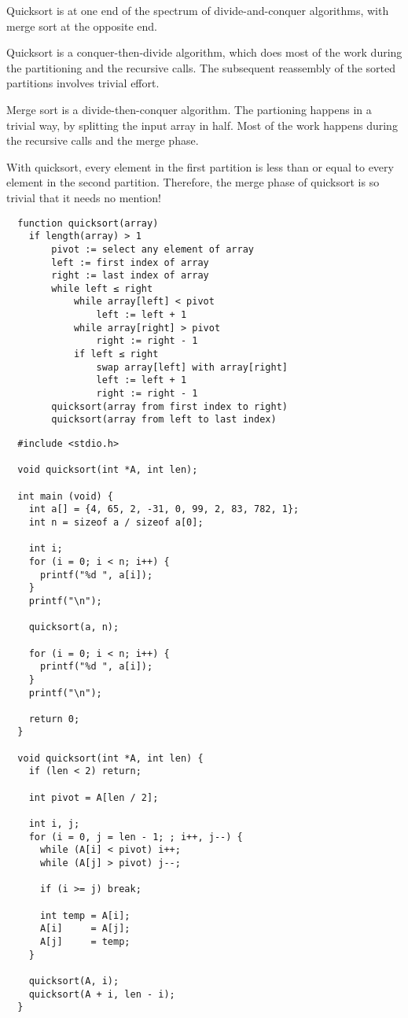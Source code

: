 \documentclass{article}
\begin{document}
Quicksort is at one end of the spectrum of divide-and-conquer algorithms, with merge sort at the opposite end.

Quicksort is a conquer-then-divide algorithm, which does most of the work during the partitioning and the recursive calls. 
The subsequent reassembly of the sorted partitions involves trivial effort.

Merge sort is a divide-then-conquer algorithm. The partioning happens in a trivial way, by splitting the input array in half. 
Most of the work happens during the recursive calls and the merge phase.

With quicksort, every element in the first partition is less than or equal to every element in the second partition. Therefore, the merge phase of quicksort is so trivial that it needs no mention!

\begin{verbatim}
  function quicksort(array)
    if length(array) > 1
        pivot := select any element of array
        left := first index of array
        right := last index of array
        while left ≤ right
            while array[left] < pivot
                left := left + 1
            while array[right] > pivot
                right := right - 1
            if left ≤ right
                swap array[left] with array[right]
                left := left + 1
                right := right - 1
        quicksort(array from first index to right)
        quicksort(array from left to last index)
\end{verbatim}

\begin{verbatim}
  #include <stdio.h>
 
  void quicksort(int *A, int len);
    
  int main (void) {
    int a[] = {4, 65, 2, -31, 0, 99, 2, 83, 782, 1};
    int n = sizeof a / sizeof a[0];
    
    int i;
    for (i = 0; i < n; i++) {
      printf("%d ", a[i]);
    }
    printf("\n");
    
    quicksort(a, n);
    
    for (i = 0; i < n; i++) {
      printf("%d ", a[i]);
    }
    printf("\n");
    
    return 0;
  }
    
  void quicksort(int *A, int len) {
    if (len < 2) return;
    
    int pivot = A[len / 2];
    
    int i, j;
    for (i = 0, j = len - 1; ; i++, j--) {
      while (A[i] < pivot) i++;
      while (A[j] > pivot) j--;
    
      if (i >= j) break;
    
      int temp = A[i];
      A[i]     = A[j];
      A[j]     = temp;
    }
    
    quicksort(A, i);
    quicksort(A + i, len - i);
  }
\end{verbatim}
\end{document}
